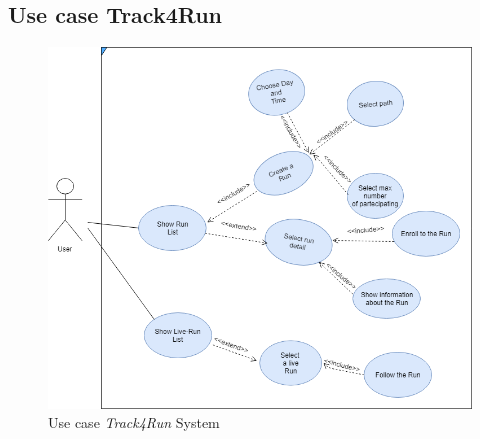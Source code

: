 \subsection{Use case Track4Run}

\begin{figure}[H]
    \centering
    \includegraphics[scale=0.4]{rasdL/Pictures/run.png}
    \caption{Use case  \emph{Track4Run} System}
\end{figure}